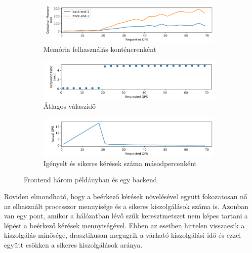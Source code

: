 \begin{figure}
\hfill
\begin{subfigure}{\textwidth}
    \includegraphics[width=\textwidth]{figures/3FE-1BE-stack/container-mem.png}
    \caption{Memória felhasználás konténerenként}
    \label{subfig:stack-container-mem}
\end{subfigure}

\hfill
\begin{subfigure}{\textwidth}
    \includegraphics[width=\textwidth]{figures/3FE-1BE-stack/resp-time.png}
    \caption{Átlagos válaszidő}
    \label{subfig:stack-resp-time}
\end{subfigure}

\hfill
\begin{subfigure}{\textwidth}
    \includegraphics[width=\textwidth]{figures/3FE-1BE-stack/actual-qps.png}
    \caption{Igényelt és sikeres kérések száma másodpercenként}
    \label{subfig:stack-actual-qps}
\end{subfigure}
        
\caption{Frontend három példányban és egy backend}
\label{fig:3FE_stack_1BE}
\end{figure}

Röviden elmondható, hogy a beérkező kérések növelésével együtt fokozatosan nő az elhasznált processzor mennyisége és a sikeres kiszolgálások száma is.
Azonban van egy pont, amikor a hálózatban lévő szűk keresztmetszet nem képes tartani a lépést a beérkező kérések mennyiségével. 
Ebben az esetben hirtelen visszaesik a kiszolgálás minősége, drasztikusan megugrik a várható kiszolgálási idő és ezzel együtt csökken a sikeres kiszolgálások aránya.


